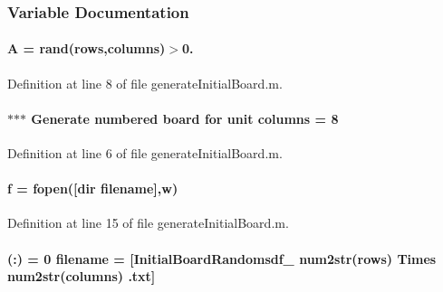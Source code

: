 \subsubsection{Variable Documentation}
\hypertarget{a00107_a3b98e2dffc6cb06a89dcb0d5c60a0206}{}
\paragraph[{A}]{\setlength{\rightskip}{0pt plus 5cm}A = rand({\bf rows},{\bf columns})$>$0.}\label{a00107_a3b98e2dffc6cb06a89dcb0d5c60a0206}


Definition at line 8 of file generate\+Initial\+Board.\+m.

\hypertarget{a00107_a616e3ce2d5365d3d3c41f5d00d4a1985}{}
\paragraph[{columns}]{\setlength{\rightskip}{0pt plus 5cm}$\ast$$\ast$$\ast$ Generate numbered board for unit columns = 8}\label{a00107_a616e3ce2d5365d3d3c41f5d00d4a1985}


Definition at line 6 of file generate\+Initial\+Board.\+m.

\hypertarget{a00107_a633de4b0c14ca52ea2432a3c8a5c4c31}{}
\paragraph[{f}]{\setlength{\rightskip}{0pt plus 5cm}f = fopen(\mbox{[}dir {\bf filename}\mbox{]},\textquotesingle{}w\textquotesingle{})}\label{a00107_a633de4b0c14ca52ea2432a3c8a5c4c31}


Definition at line 15 of file generate\+Initial\+Board.\+m.

\hypertarget{a00107_a4a32877dda2cdbef8aa5f01eacc16f0c}{}
\paragraph[{filename}]{ (\+:) = 0 filename = \mbox{[}\textquotesingle{}Initial\+Board\+Randomsdf\+\_\+\textquotesingle{} num2str({\bf rows}) \textquotesingle{}Times\textquotesingle{} num2str({\bf columns}) \textquotesingle{}.txt\textquotesingle{}\mbox{]}}\label{a00107_a4a32877dda2cdbef8aa5f01eacc16f0c}


